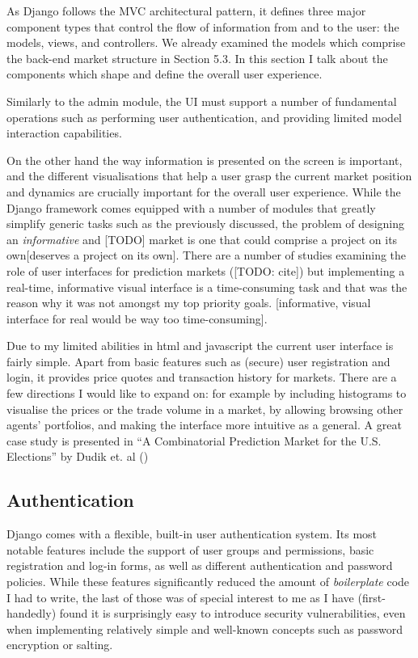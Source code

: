 \documentclass[bsc,frontabs,twoside,singlespacing,parskip,deptreport]{infthesis}     %
\begin{document}
	As Django follows the MVC architectural pattern, it defines three major component types that control the flow of information from and to the user: the models, views, and controllers. We already examined the models which comprise the back-end market structure in Section 5.3. In this section I talk about the components which shape and define the overall user experience. 


	Similarly to the admin module, the UI must support a number of fundamental operations such as performing user authentication, and providing limited model interaction capabilities. 


On the other hand the way information is presented on the screen is important, and the different visualisations that help a user grasp the current market position and dynamics are crucially important for the overall user experience. While the Django framework comes equipped with a number of modules that greatly simplify generic tasks such as the previously discussed, the problem of designing an {\em informative} and [TODO] market is one that could comprise a project on its own[deserves a project on its own]. There are a number of studies examining the role of user interfaces for prediction markets ([TODO: cite]) but implementing a real-time, informative visual interface is a time-consuming task and that was the reason why it was not amongst my top priority goals. [informative, visual interface for real would be way too time-consuming]. 


    Due to my limited abilities in html and javascript the current user interface is fairly simple. Apart from basic features such as (secure) user registration and login, it provides price quotes and transaction history for markets. There are a few directions I would like to expand on: for example by including histograms to visualise the prices or the trade volume in a market, by allowing browsing other agents’ portfolios, and making the interface more intuitive as a general. A great case study is presented in “A Combinatorial Prediction Market for the U.S. Elections” by Dudik et. al (\cite{dudik_combinatorial_2013})

\subsection{Authentication}

	Django comes with a flexible, built-in user authentication system. Its most notable features include the support of user groups and permissions, basic registration and log-in forms, as well as different authentication and password policies. While these features significantly reduced the amount of {\it boilerplate} code I had to write, the last of those was of special interest to me as I have (first-handedly) found it is surprisingly easy to introduce security vulnerabilities, even when implementing relatively simple and well-known concepts such as password encryption or salting. 
\end{document}

